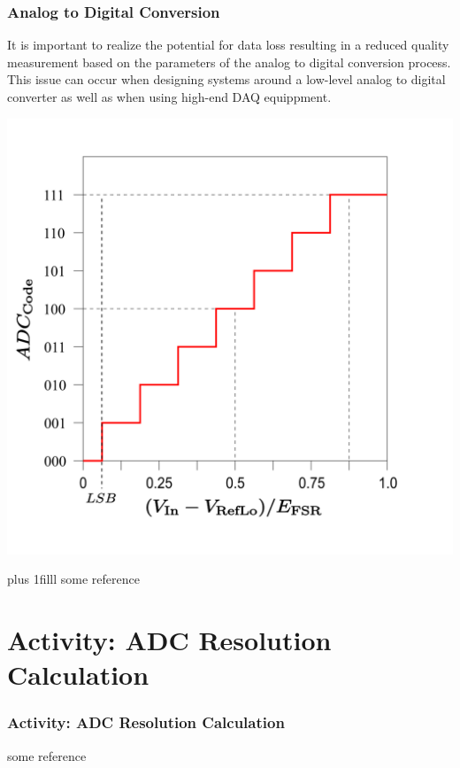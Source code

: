 \documentclass[fleqn]{beamer} %
\newcommand{\sectiontitleIV}{Analog to Digital Conversion}
\newcommand{\sectiontitleV}{Activity: ADC Resolution Calculation}
\newcommand{\btVFill}{\vskip0pt plus 1filll}
\begin{document}
\begin{frame}[label=sectionIV] \scriptsize
\frametitle{\sectiontitleIV}
\bigskip

 It is important to realize the potential for data loss resulting in a reduced quality measurement based on the parameters of the analog to digital conversion process. This issue can occur when designing systems around a low-level analog to digital converter as well as when using high-end DAQ equippment.  

\includegraphics[scale=.2]{ADC_voltage_resolution.png}

\btVFill
\tiny{some reference}	
\end{frame}


\section{\sectiontitleV}	

\begin{frame}[label=sectionV] \small
\frametitle{\sectiontitleV}
\bigskip

\vspace{50mm}
\tiny{some reference}	
\end{frame}
\end{document}
